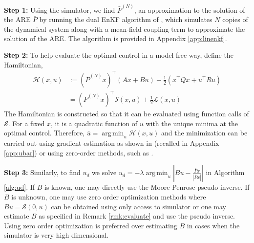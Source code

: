 \documentclass[letterpaper, 10 pt, conference]{ieeeconf}  %
\newcommand{\tp}{^\top}
\renewcommand{\S}{\mathcal{S}}
\newcommand{\ham}{\mathcal{H}}
\newcommand{\half}{\frac{1}{2}}
\DeclareMathOperator*{\argmin}{arg\,min}
\newcommand{\todo}[1]{{\color{blue} #1}}
\renewcommand{\L}{\mathcal{L}}
\begin{document}
\textbf{Step 1:}
Using the simulator, we find $\bar{P}^{(N)}$, an approximation to the solution of the ARE $\bar{P}$ by running the dual EnKF algorithm of \cite{joshi-2022}, which simulates $N$ copies of the dynamical system  along with a mean-field coupling term to approximate the solution of the ARE. The algorithm is provided in Appendix \ref{app:linenkf}. 

\textbf{Step 2:} %
To help evaluate the optimal control in a model-free way, define the Hamiltonian,
\begin{align}
\ham(x,u) &:= (\bar{P}^{(N)}x)\tp(Ax + Bu) + \half(x\tp Q x + u\tp R u) \nonumber
\\ &= (\bar{P}^{(N)}x)\tp \S(x,u) + \half\L(x,u) \label{eq:ham-lin}
\end{align}
The Hamiltonian is constructed so that it can be evaluated using function calls of $\S$. For a fixed $x$, it is a quadratic function of $u$ with the unique minima at the optimal control. 
Therefore, $\bar{u} = \argmin_{u} \ham(x,u)$ and the minimization can be carried out using gradient estimation as shown in \cite[Algorithm 2]{joshi-2022} (recalled in Appendix \ref{app:ubar}) or using zero-order methods, such as \cite{bach-2016}. 

\textbf{Step 3:}
Similarly, to find $u_d$ we solve $u_d = -\lambda \argmin_{u} | Bu - \frac{\bar{P}x}{| \bar{P}x|} |$ in Algorithm \ref{alg:ud}.  If $B$ is known, one may directly use the Moore-Penrose pseudo inverse. If $B$ is unknown, one may use zero order optimization methods \cite{bach-2016} where $Bu = \S(0,u)$ can be obtained using only access to simulator or one may estimate $B$ as specified in Remark \ref{rmk:evaluate} and use the pseudo inverse. 
{Using zero order optimization is  preferred over estimating $B$ in cases when the simulator is very high dimensional. }
\end{document}
